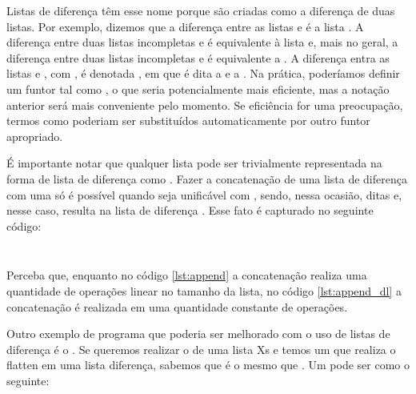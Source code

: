 \documentclass{article}
\begin{document}
Listas de diferença têm esse nome porque são criadas como a diferença de duas listas. Por exemplo, dizemos que  a diferença entre as listas
\codigo{[a,b,c]} e \codigo{[c]} é a lista \codigo{[a,b]}. A diferença entre duas listas incompletas \codigo{[a,b|Xs]} e  é equivalente à lista \codigo{[a,b]} e, mais no geral, a diferença entre duas listas incompletas \codigo{[$x_0$, ...,$x_i$|Xs]} e  é equivalente a \codigo{[$x_0$, ...,$x_i$]}.
A diferença entra as listas  e , com , é denotada , em que  é dita a  e  a . Na prática,
poderíamos definir um funtor tal como , o que seria potencialmente mais eficiente, mas a notação anterior será
mais conveniente pelo momento. Se eficiência for uma preocupação, termos como  poderiam ser substituídos automaticamente por outro funtor apropriado.


É importante notar que qualquer lista  pode ser trivialmente representada na forma de lista de diferença como . Fazer a concatenação de uma lista de diferença  com uma 
só é possível quando  seja unificável com , sendo, nessa ocasião, ditas   e, nesse caso, resulta na lista de diferença . Esse fato é capturado no seguinte código:

\inputminted{prolog}{../Exemplos/Cap3/prog5_concatenate_diff.pl}\label{lst:append_dl}
\inputminted{prolog}{../Exemplos/Cap3/prog3_flatten.pl}\label{lst:flatten}

Perceba que, enquanto no código \ref{lst:append} a concatenação realiza uma quantidade de operações linear no tamanho da lista,
no código \ref{lst:append_dl} a concatenação é realizada em uma quantidade constante de operações.

Outro exemplo de programa que poderia ser melhorado com o uso de listas de diferença é o
. Se queremos realizar o  de uma lista Xs e temos um
 que realiza o flatten em uma lista diferença, sabemos que
 é o mesmo que . Um
 pode ser como o seguinte:

\inputminted{prolog}{../Exemplos/Cap3/prog_flatten_dl1.pl}\label{lst:flatten_dl}
\end{document}
